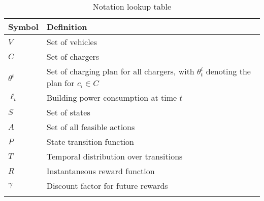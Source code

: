 \begin{table}[!t]
\caption{Notation lookup table}
\centering
\footnotesize

\setlength\extrarowheight{2pt} %
\begin{tabularx}{0.49\textwidth}{|l|X|}
\hline

{\textbf{Symbol}}     & {\textbf{Definition}}                           \\ \hline\rowcolor{Gray}
$V$                 	  & Set of vehicles                                                                               \\ \hline
$C$                       & Set of chargers                                                                               \\ \hline\rowcolor{Gray}
$\theta^t$                & Set of charging plan for all chargers, with $\theta^i_t$ denoting the plan for $c_i \in C$    \\ \hline
$\ell_t$                  & Building power consumption at time $t$                                                                              \\ \hline\rowcolor{Gray}
$S$                       & Set of states                                                                                 \\ \hline
$A$                       & Set of all feasible actions                                                                   \\ \hline\rowcolor{Gray}
$P$                  	  & State transition function                                                                     \\ \hline
$T$                       & Temporal distribution over transitions                                                        \\ \hline\rowcolor{Gray}
$R$                       & Instantaneous reward function                                                                 \\ \hline
$\gamma$                  & Discount factor for future rewards                                                            \\ \hline\rowcolor{Gray}

\end{tabularx}
\end{table}
